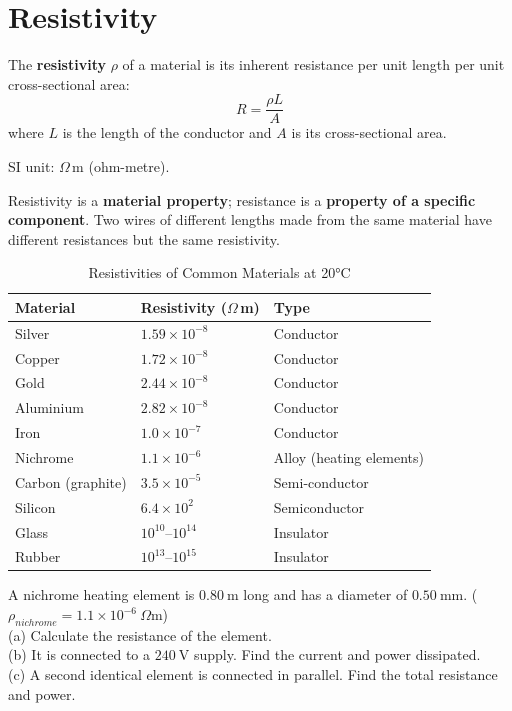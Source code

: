 \section{Resistivity}

\begin{definitionbox}[Resistivity]
The \textbf{resistivity} $\rho$ of a material is
its inherent resistance per unit length per unit
cross-sectional area:
\[
  R = \frac{\rho L}{A}
\]
where $L$ is the length of the conductor and $A$
is its cross-sectional area.

SI unit: $\Omega$\,m (ohm-metre).

Resistivity is a \textbf{material property};
resistance is a \textbf{property of a specific
component}. Two wires of different lengths made
from the same material have different resistances
but the same resistivity.
\end{definitionbox}

\begin{table}[H]
\centering
\caption{Resistivities of Common Materials at 20°C}
\label{tab:resistivity}
\begin{tabular}{lll}
\toprule
\textbf{Material} & \textbf{Resistivity ($\Omega$\,m)} &
\textbf{Type}\\
\midrule
Silver & $1.59\times10^{-8}$ & Conductor\\
Copper & $1.72\times10^{-8}$ & Conductor\\
Gold & $2.44\times10^{-8}$ & Conductor\\
Aluminium & $2.82\times10^{-8}$ & Conductor\\
Iron & $1.0\times10^{-7}$ & Conductor\\
Nichrome & $1.1\times10^{-6}$ & Alloy (heating elements)\\
Carbon (graphite) & $3.5\times10^{-5}$ & Semi-conductor\\
Silicon & $6.4\times10^{2}$ & Semiconductor\\
Glass & $10^{10}$--$10^{14}$ & Insulator\\
Rubber & $10^{13}$--$10^{15}$ & Insulator\\
\bottomrule
\end{tabular}
\end{table}

\begin{examplebox}[23.2]
A nichrome heating element is $0.80\ \text{m}$ long
and has a diameter of $0.50\ \text{mm}$.
($\rho_{nichrome} = 1.1\times10^{-6}\ \Omega\text{m}$)\\
(a) Calculate the resistance of the element.\\
(b) It is connected to a $240\ \text{V}$ supply.
Find the current and power dissipated.\\
(c) A second identical element is connected in
parallel. Find the total resistance and power.
\end{examplebox}

